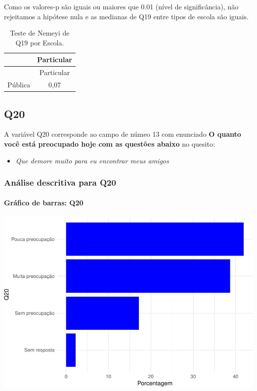 \documentclass[]{article}
\providecommand{\tightlist}{%
  \setlength{\itemsep}{0pt}\setlength{\parskip}{0pt}}
\let\oldparagraph\paragraph
\renewcommand{\paragraph}[1]{\oldparagraph{#1}\mbox{}}
\begin{document}
Como os valores-p são iguais ou maiores que 0.01 (nível de significância), não rejeitamos a hipótese nula e as medianas de Q19 entre tipos de escola são iguais.

\begin{longtable}[]{@{}lc@{}}
\caption{\label{tab:unnamed-chunk-357}Teste de Nemeyi de Q19 por Escola.}\tabularnewline
\toprule
& Particular\tabularnewline
\midrule
\endfirsthead
\toprule
& Particular\tabularnewline
\midrule
\endhead
Pública & 0,07\tabularnewline
\bottomrule
\end{longtable}

\cleardoublepage

\hypertarget{q20}{%
\subsection{Q20}\label{q20}}

A variável Q20 corresponde ao campo de númeo 13 com enunciado \textbf{O quanto você está preocupado hoje com as questões abaixo} no quesito:

\begin{itemize}
\tightlist
\item
  \emph{Que demore muito para eu encontrar meus amigos}
\end{itemize}

\hypertarget{anuxe1lise-descritiva-para-q20}{%
\subsubsection{Análise descritiva para Q20}\label{anuxe1lise-descritiva-para-q20}}

\hypertarget{gruxe1fico-de-barras-q20}{%
\paragraph{Gráfico de barras: Q20}\label{gruxe1fico-de-barras-q20}}

\begin{center}\includegraphics[width=0.75\linewidth]{relatorio_covid19_files/figure-latex/unnamed-chunk-364-1} \end{center}
\end{document}
